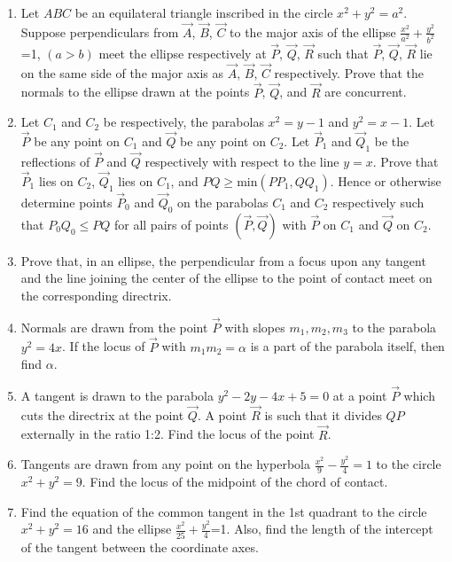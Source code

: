 \begin{enumerate}
\item Let $ABC$ be an equilateral triangle inscribed in the circle $x^2+y^2=a^2$. Suppose perpendiculars from $\vec{A}$, $\vec{B}$, $\vec{C}$ to the major axis of the ellipse $\frac{x^2}{a^2}+\frac{y^2}{b^2}$=1, $(a>b)$ meet the ellipse respectively at $\vec{P}$, $\vec{Q}$, $\vec{R}$ such that $\vec{P}$, $\vec{Q}$, $\vec{R}$ lie on the same side of the major axis as $\vec{A}$, $\vec{B}$, $\vec{C}$ respectively. Prove that the normals to the ellipse drawn at the points $\vec{P}$, $\vec{Q}$, and $\vec{R}$ are concurrent. \hfill{}

\item Let $C_1$ and $C_2$ be respectively, the parabolas $x^2=y-1$ and $y^2=x-1$. Let $\vec{P}$ be any point on $C_1$ and $\vec{Q}$ be any point on $C_2$. Let $\vec{P}_1$ and $\vec{Q}_1$ be the reflections of $\vec{P}$ and $\vec{Q}$ respectively with respect to the line $y=x$. Prove that $\vec{P}_1$ lies on $C_2$, $\vec{Q}_1$ lies on $C_1$, and $PQ \geq \text{min}({PP_1, QQ_1})$. Hence or otherwise determine points $\vec{P}_0$ and $\vec{Q}_0$ on the parabolas $C_1$ and $C_2$ respectively such that $P_0Q_0 \leq PQ$ for all pairs of points $(\vec{P},\vec{Q})$ with $\vec{P}$ on $C_1$ and $\vec{Q}$ on $C_2$. \hfill{}
\item Prove that, in an ellipse, the perpendicular from a focus upon any tangent and the line joining the center of the ellipse to the point of contact meet on the corresponding directrix. \hfill{}

\item Normals are drawn from the point $\vec{P}$ with slopes $m_1, m_2, m_3$ to the parabola $y^2=4x$. If the locus of $\vec{P}$ with $m_1m_2=\alpha$ is a part of the parabola itself, then find $\alpha$. \hfill{}

\item A tangent is drawn to the parabola $y^2-2y-4x+5=0$ at a point $\vec{P}$ which cuts the directrix at the point $\vec{Q}$. A point $\vec{R}$ is such that it divides $QP$ externally in the ratio 1:2. Find the locus of the point $\vec{R}$. \hfill{}

\item Tangents are drawn from any point on the hyperbola $\frac{x^2}{9}-\frac{y^2}{4}=1$ to the circle $x^2+y^2=9$. Find the locus of the midpoint of the chord of contact. \hfill{}

\item Find the equation of the common tangent in the 1st quadrant to the circle $x^2+y^2=16$ and the ellipse $\frac{x^2}{25}+\frac{y^2}{4}$=1. Also, find the length of the intercept of the tangent between the coordinate axes. \hfill{} 


\end{enumerate}
